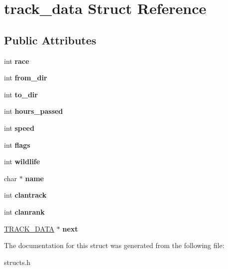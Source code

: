 \hypertarget{structtrack__data}{\section{track\-\_\-data Struct Reference}
\label{structtrack__data}
}
\subsection*{Public Attributes}
\begin{DoxyCompactItemize}
\item 
\hypertarget{structtrack__data_a5de35871ef6b761e649af2b77452c392}{int {\bfseries race}}\label{structtrack__data_a5de35871ef6b761e649af2b77452c392}

\item 
\hypertarget{structtrack__data_ad08d0b43c25fcad25ba82bf68dd00884}{int {\bfseries from\-\_\-dir}}\label{structtrack__data_ad08d0b43c25fcad25ba82bf68dd00884}

\item 
\hypertarget{structtrack__data_afcae154543b99595a718f7eae7c64871}{int {\bfseries to\-\_\-dir}}\label{structtrack__data_afcae154543b99595a718f7eae7c64871}

\item 
\hypertarget{structtrack__data_af4f3d04157357eedd375309185853bd6}{int {\bfseries hours\-\_\-passed}}\label{structtrack__data_af4f3d04157357eedd375309185853bd6}

\item 
\hypertarget{structtrack__data_a36a4f55640b09422b99d3d096bd03153}{int {\bfseries speed}}\label{structtrack__data_a36a4f55640b09422b99d3d096bd03153}

\item 
\hypertarget{structtrack__data_a82bd7b9d90edd63ac1ba44afccf051f5}{int {\bfseries flags}}\label{structtrack__data_a82bd7b9d90edd63ac1ba44afccf051f5}

\item 
\hypertarget{structtrack__data_aa59f6165884a647bc84e7d94ecda164f}{int {\bfseries wildlife}}\label{structtrack__data_aa59f6165884a647bc84e7d94ecda164f}

\item 
\hypertarget{structtrack__data_ab9e6413e572c2f0d708ffc27fd8948ec}{char $\ast$ {\bfseries name}}\label{structtrack__data_ab9e6413e572c2f0d708ffc27fd8948ec}

\item 
\hypertarget{structtrack__data_a39d1099f1c751a13cf5326a1217e8df7}{int {\bfseries clantrack}}\label{structtrack__data_a39d1099f1c751a13cf5326a1217e8df7}

\item 
\hypertarget{structtrack__data_a5fe2d58facd7b6441340aafbeb5854b2}{int {\bfseries clanrank}}\label{structtrack__data_a5fe2d58facd7b6441340aafbeb5854b2}

\item 
\hypertarget{structtrack__data_a5211c02aba386a1c120235dcc6333916}{\hyperlink{structtrack__data}{T\-R\-A\-C\-K\-\_\-\-D\-A\-T\-A} $\ast$ {\bfseries next}}\label{structtrack__data_a5211c02aba386a1c120235dcc6333916}

\end{DoxyCompactItemize}


The documentation for this struct was generated from the following file\-:\begin{DoxyCompactItemize}
\item 
structs.\-h\end{DoxyCompactItemize}
